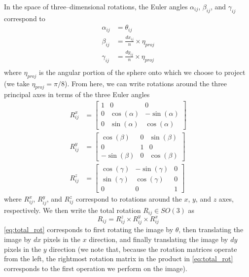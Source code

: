 \documentclass[11pt]{article}
\begin{document}
%
In the space of three--dimensional rotations, the Euler angles $\alpha_{ij}$, $\beta_{ij}$, and $\gamma_{ij}$ correspond to
\begin{equation} \label{eq:angle_relations}
\begin{aligned}
	\alpha_{ij} &= \theta_{ij} \\
	\beta_{ij} &= \frac{dx_{ij}}{n} \times \eta_{proj} \\
	\gamma_{ij} &= \frac{dy_{ij}}{n} \times \eta_{proj} \\
\end{aligned}
\end{equation}
where $\eta_{proj}$ is the angular portion of the sphere onto which we choose to project (we take $\eta_{proj} =  \pi/8$).
%
From here, we can write rotations around the three principal axes in terms of the three Euler angles
\begin{equation}
\begin{aligned}
	R^x_{ij} &= \begin{bmatrix}
	1 & 0 & 0 \\
    0 & \cos(\alpha) & -\sin(\alpha) \\
    0 & \sin(\alpha) & \cos(\alpha)
	\end{bmatrix} \\
	R^y_{ij} &= \begin{bmatrix}
	\cos(\beta) & 0 & \sin(\beta) \\
    0 & 1 & 0 \\
    -\sin(\beta) & 0 & \cos(\beta)
    \end{bmatrix} \\
	R^z_{ij} &= \begin{bmatrix} 
	\cos(\gamma) & -\sin(\gamma) & 0 \\
    \sin(\gamma) & \cos(\gamma) & 0 \\
    0 & 0 & 1 
    \end{bmatrix}
\end{aligned}
\end{equation}
where $R^x_{ij}$, $R^y_{ij}$, and $R^z_{ij}$ correspond to rotations around the $x$, $y$, and $z$ axes, respectively.
%
We then write the total rotation $R_{ij} \in SO(3)$ as 
\begin{equation} \label{eq:total_rot}
	R_{ij}	 = R^z_{ij} \times R^y_{ij} \times R^x_{ij}
\end{equation}
%
\eqref{eq:total_rot} corresponds to first rotating the image by $\theta$, then translating the image by $dx$ pixels in the $x$ direction, and finally translating the image by $dy$ pixels in the $y$ direction (we note that, because the rotation matrices operate from the left, the rightmost rotation matrix in the product in \eqref{eq:total_rot} corresponds to the first operation we perform on the image).
\end{document}
